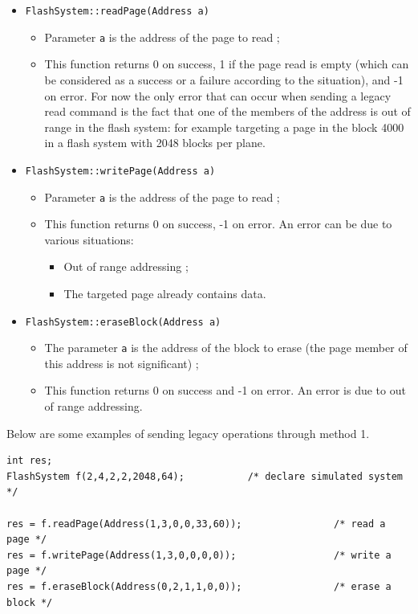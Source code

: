 \begin{itemize}
  \item \verb+FlashSystem::readPage(Address a)+
  \begin{itemize}
    \item Parameter \verb+a+ is the address of the page to read ;
    \item This function returns 0 on success, 1 if the page read is empty (which can be considered as a success or a failure according to the situation), and -1 on error. For now the only error that can occur when sending a legacy read command is the fact that one of the members of the address is out of range in the flash system: for example targeting a page in the block 4000 in a flash system with 2048 blocks per plane.
  \end{itemize}
  
  \item \verb+FlashSystem::writePage(Address a)+
  \begin{itemize}
    \item Parameter \verb+a+ is the address of the page to read ;
    \item This function returns 0 on success, -1 on error. An error can be due to various situations:
    \begin{itemize}
      \item Out of range addressing ;
      \item The targeted page already contains data.
    \end{itemize}
  \end{itemize}
  
  \item \verb+FlashSystem::eraseBlock(Address a)+
  \begin{itemize}
    \item The parameter \verb+a+ is the address of the block to erase (the page member of this address is not significant) ;
    \item This function returns 0 on success and -1 on error. An error is due to out of range addressing.
  \end{itemize}
\end{itemize}

Below are some examples of sending legacy operations through method 1.
\begin{lstlisting}
int res;
FlashSystem f(2,4,2,2,2048,64);           /* declare simulated system */

res = f.readPage(Address(1,3,0,0,33,60));                /* read a page */
res = f.writePage(Address(1,3,0,0,0,0));                 /* write a page */
res = f.eraseBlock(Address(0,2,1,1,0,0));                /* erase a block */
\end{lstlisting}

